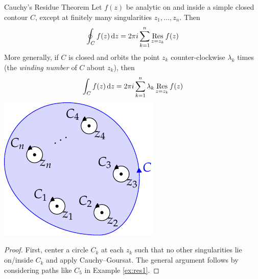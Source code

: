 \begin{thm}[lower separated=false, sidebyside, sidebyside align=top seam, sidebyside gap=0pt, righthand width=0.3\linewidth]{Cauchy's Residue Theorem}{}
	Let $f(z)$ be analytic on and inside a simple closed contour $C$, except at finitely many singularities $z_1,\ldots,z_n$. Then
	\[
		\oint_Cf(z)\,{\mathrm{d} z}=2\pi i\sum_{k=1}^n\operatorname*{Res}_{z=z_k}f(z)
	\]
	More generally, if $C$ is closed and orbits the point $z_k$ counter-clockwise $\lambda_k$ times (the \emph{winding number} of $C$ about $z_k$), then
	\[
		\int_Cf(z)\,{\mathrm{d} z}=2\pi i\sum_{k=1}^n\lambda_k\operatorname*{Res}_{z=z_k}f(z)
	\]
	\tcblower
	\flushright\includegraphics[scale=0.95]{res2}
\end{thm}


\begin{proof}
	First, center a circle $C_k$ at each $z_k$ such that no other singularities lie on/inside $C_k$ and apply Cauchy--Goursat. The general argument follows by considering paths like $C_5$ in Example \ref{ex:res1}. 
\end{proof}


